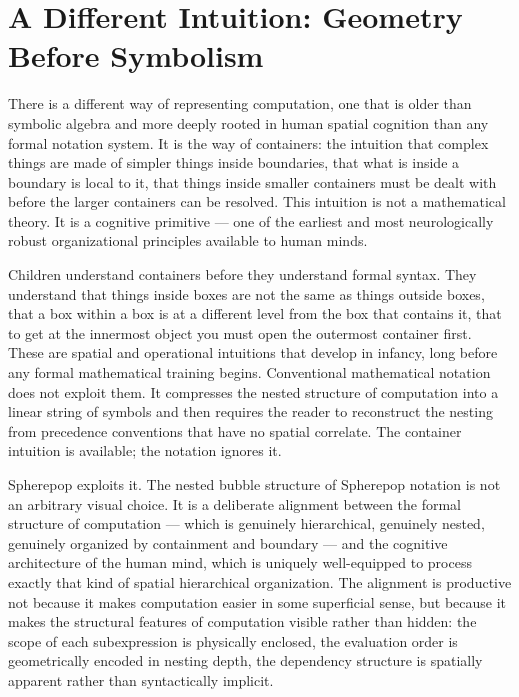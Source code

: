 \documentclass[12pt,openany]{book}
\theoremstyle{plain}
\theoremstyle{definition}
\theoremstyle{remark}
\begin{document}
\section*{A Different Intuition: Geometry Before Symbolism}

There is a different way of representing computation, one that is older than symbolic algebra and more deeply rooted in human spatial cognition than any formal notation system. It is the way of containers: the intuition that complex things are made of simpler things inside boundaries, that what is inside a boundary is local to it, that things inside smaller containers must be dealt with before the larger containers can be resolved. This intuition is not a mathematical theory. It is a cognitive primitive — one of the earliest and most neurologically robust organizational principles available to human minds.

Children understand containers before they understand formal syntax. They understand that things inside boxes are not the same as things outside boxes, that a box within a box is at a different level from the box that contains it, that to get at the innermost object you must open the outermost container first. These are spatial and operational intuitions that develop in infancy, long before any formal mathematical training begins. Conventional mathematical notation does not exploit them. It compresses the nested structure of computation into a linear string of symbols and then requires the reader to reconstruct the nesting from precedence conventions that have no spatial correlate. The container intuition is available; the notation ignores it.

Spherepop exploits it. The nested bubble structure of Spherepop notation is not an arbitrary visual choice. It is a deliberate alignment between the formal structure of computation — which is genuinely hierarchical, genuinely nested, genuinely organized by containment and boundary — and the cognitive architecture of the human mind, which is uniquely well-equipped to process exactly that kind of spatial hierarchical organization. The alignment is productive not because it makes computation easier in some superficial sense, but because it makes the structural features of computation visible rather than hidden: the scope of each subexpression is physically enclosed, the evaluation order is geometrically encoded in nesting depth, the dependency structure is spatially apparent rather than syntactically implicit.
\end{document}
